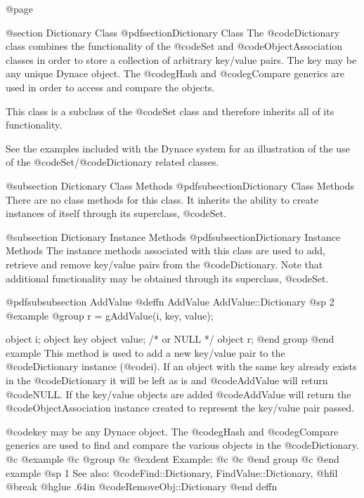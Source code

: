 @page

@section Dictionary Class
@pdfsection{Dictionary Class}
The @code{Dictionary} class combines the functionality of the @code{Set}
and @code{ObjectAssociation} classes in order to store a collection of
arbitrary key/value pairs.  The key may be any unique Dynace object.
The @code{gHash} and @code{gCompare} generics are used in order to
access and compare the objects.

This class is a subclass of the @code{Set} class and therefore inherits
all of its functionality.

See the examples included with the Dynace system for an illustration of the
use of the @code{Set}/@code{Dictionary} related classes.


@subsection Dictionary Class Methods
@pdfsubsection{Dictionary Class Methods}
There are no class methods for this class.  It inherits the ability
to create instances of itself through its superclass, @code{Set}.



@subsection Dictionary Instance Methods
@pdfsubsection{Dictionary Instance Methods}
The instance methods associated with this class are used to add, retrieve
and remove key/value pairs from the @code{Dictionary}.  Note that additional
functionality may be obtained through its superclass, @code{Set}.






@pdfsubsubsection {AddValue}
@deffn {AddValue} AddValue::Dictionary
@sp 2
@example
@group
r = gAddValue(i, key, value);

object  i;
object  key
object  value;    /*  or NULL   */
object  r;
@end group
@end example
This method is used to add a new key/value pair to the @code{Dictionary}
instance (@code{i}).  If an object with the same key already exists in
the @code{Dictionary} it will be left as is and @code{AddValue} will return
@code{NULL}.  If the key/value objects are added @code{AddValue} will
return the @code{ObjectAssociation} instance created to represent the
key/value pair passed.

@code{key} may be any Dynace object.  The @code{gHash} and
@code{gCompare} generics are used to find and compare the various
objects in the @code{Dictionary}.
@c @example
@c @group
@c @exdent Example:
@c 
@c @end group
@c @end example
@sp 1
See also:  @code{Find::Dictionary, FindValue::Dictionary,}
@hfil @break @hglue .64in      @code{RemoveObj::Dictionary}
@end deffn










